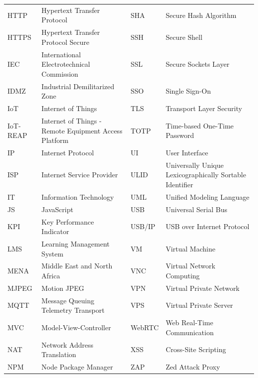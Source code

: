 {\begin{longtable}{@{}p{2cm}p{5.5cm}|p{2cm}p{5.5cm}@{}}
HTTP     & Hypertext Transfer Protocol                     & SHA      & Secure Hash Algorithm \\
HTTPS    & Hypertext Transfer Protocol Secure              & SSH      & Secure Shell \\
IEC      & International Electrotechnical Commission       & SSL      & Secure Sockets Layer \\
IDMZ     & Industrial Demilitarized Zone                   & SSO      & Single Sign-On \\
IoT      & Internet of Things                              & TLS      & Transport Layer Security \\
IoT-REAP & Internet of Things - Remote Equipment Access Platform & TOTP & Time-based One-Time Password \\
IP       & Internet Protocol                               & UI       & User Interface \\
ISP      & Internet Service Provider                       & ULID     & Universally Unique Lexicographically Sortable Identifier \\
IT       & Information Technology                          & UML      & Unified Modeling Language \\
JS       & JavaScript                                      & USB      & Universal Serial Bus \\
KPI      & Key Performance Indicator                       & USB/IP   & USB over Internet Protocol \\
LMS      & Learning Management System                      & VM       & Virtual Machine \\
MENA     & Middle East and North Africa                    & VNC      & Virtual Network Computing \\
MJPEG    & Motion JPEG                                     & VPN      & Virtual Private Network \\
MQTT     & Message Queuing Telemetry Transport             & VPS      & Virtual Private Server \\
MVC      & Model-View-Controller                           & WebRTC   & Web Real-Time Communication \\
NAT      & Network Address Translation                     & XSS      & Cross-Site Scripting \\
NPM      & Node Package Manager                            & ZAP      & Zed Attack Proxy \\
\end{longtable}
}